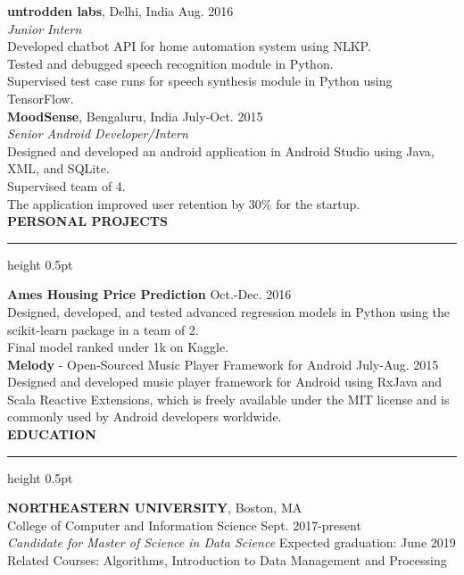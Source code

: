 \documentclass[a4paper]{article}
\newcommand{\myline}{\par
  \kern2pt %
  \hrule height 0.5pt
  \kern2pt %
}
\newcommand{\mybullet}{
	\indent \textbullet \hspace*{2mm}
}
\begin{document}
	\noindent
	\textbf{untrodden labs}, Delhi, India \hfill Aug. 2016 \\
	\textit{Junior Intern}\\
	\mybullet Developed chatbot API for home automation system using NLKP. \\
	\mybullet Tested and debugged speech recognition module in Python. \\
	\mybullet Supervised test case runs for speech synthesis module in Python using TensorFlow. \\
	
	\noindent
	\textbf{MoodSense}, Bengaluru, India \hfill July-Oct. 2015 \\
	\textit{Senior Android Developer/Intern} \\
	\mybullet Designed and developed an android application in Android Studio using Java, XML, and SQLite. \\
	\mybullet Supervised team of 4. \\
	\mybullet The application improved user retention by 30\% for the startup. \\
	
	\noindent
	{\large \textbf{PERSONAL PROJECTS}}
	\myline 
	\smallskip
	
	\noindent
	\textbf{Ames Housing Price Prediction} \hfill Oct.-Dec. 2016 \\
	\mybullet Designed, developed, and tested advanced regression models in Python using the scikit-learn package in a team of 2. \\
	\mybullet Final model ranked under 1k on Kaggle. \\
	
	\noindent
	\textbf{Melody} - Open-Sourced Music Player Framework for Android \hfill July-Aug. 2015 \\
	\mybullet Designed and developed music player framework for Android using RxJava and Scala Reactive Extensions, which is 
			freely \indent\indent available under the MIT license and is commonly used by Android developers worldwide. \\
		
	\noindent
	{\large \textbf{EDUCATION}}
	\myline 
	\smallskip
	
	\noindent
	\textbf{NORTHEASTERN UNIVERSITY}, Boston, MA \\
	\indent College of Computer and Information Science \hfill Sept. 2017-present \\
	\indent \textit{Candidate for Master of Science in Data Science} \hfill Expected graduation: June 2019 \\
	\indent Related Courses: Algorithms, Introduction to Data Management and Processing \\
	
\end{document}
